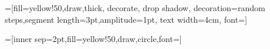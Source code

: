 \newenvironment{questionpart}
{\begin{enumerate}}{\end{enumerate}}
\newcommand{\tableHeading}[1]{{\bfseries\smaller{#1}}}

\newcommand\irregularline[2]{%
  let \n1 = {rand*(#1)} in
  +(0,\n1)
  \foreach \a in {0.1,0.2,...,#2}{
    let \n1 = {rand*(#1)} in
    -- +(\a,\n1)
  } 
}  %

\newcommand{\vect}[1]{\boldsymbol{#1}}

\newcommand{\predict}[1]{\hat{#1}}

\newcommand{\TPR}{\text{$\mathrm{TPR}$}}
\newcommand{\FPR}{\text{$\mathrm{FPR}$}}

\usetikzlibrary{decorations,
decorations.pathreplacing,decorations.pathmorphing}

\renewenvironment{clist}
{\begin{list}{$\bullet$}{\setlength{\leftmargin}{6pt}}}
{\end{list}}

=[fill=yellow!50,draw,thick,
decorate, drop shadow,
decoration={random steps,segment length=3pt,amplitude=1pt},
text width=4cm, font=\smaller]

=[inner sep=2pt,fill=yellow!50,draw,circle,font={\bf\smaller[3]}]

\renewcommand\postit[2][]{\tikz\node[postit,#1] {#2};}
\renewcommand\postitat[4][]{\tikz[remember picture, overlay]\node[postit,#1] at (#2,#3) {#4};}




% 

